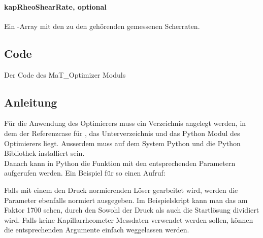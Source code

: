 \paragraph{kapRheoShearRate, optional}
Ein -Array mit den zu den  gehörenden gemessenen Scherraten.
\subsection{Code}
\label{Appendix:Python:Code}
Der Code des MaT\_Optimizer Moduls

%
\subsection{Anleitung}
\label{Appendix:Python:Anleitung}
Für die Anwendung des Optimierers muss ein Verzeichnis angelegt werden, in dem der Referenzcase für \openfoam{}, das Unterverzeichnis  und das Python Modul des Optimierers liegt.
Ausserdem muss auf dem System Python und die Python Bibliothek  installiert sein.\\
Danach kann in Python die Funktion  mit den entsprechenden Parametern aufgerufen werden.
Ein Beispiel für so einen Aufruf:

Falls mit einem den Druck normierenden Löser gearbeitet wird, werden die Parameter ebenfalls normiert ausgegeben. Im Beispielskript kann man das am Faktor 1700 sehen, durch den Sowohl der Druck als auch die Startlösung dividiert wird.
Falls keine Kapillarrheometer Messdaten verwendet werden sollen, können die entsprechenden Argumente einfach weggelassen werden.
